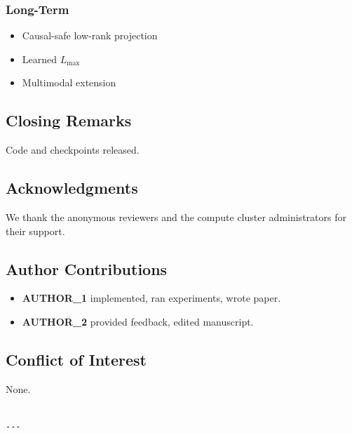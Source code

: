 \subsubsection{Long-Term}
\begin{itemize}
\item Causal-safe low-rank projection
\item Learned $L_\text{max}$
\item Multimodal extension

\end{itemize}
\subsection{Closing Remarks}

Code and checkpoints released.

\subsection{Acknowledgments}

We thank the anonymous reviewers and the compute cluster administrators for their support.

\subsection{Author Contributions}

\begin{itemize}
\item \textbf{{{AUTHOR\_1}}} implemented, ran experiments, wrote paper.
\item \textbf{{{AUTHOR\_2}}} provided feedback, edited manuscript.

\end{itemize}
\subsection{Conflict of Interest}

None.
\begin{lstlisting}

---
\end{lstlisting}